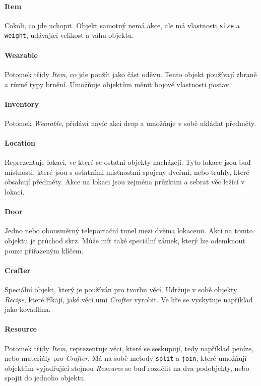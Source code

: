 \documentclass[11pt, a4paper]{article}
\def\class#1{\emph{#1}}
\begin{document}
\paragraph{Item} Cokoli, co jde uchopit. Objekt samotný nemá akce, ale má vlastnosti \texttt{size} a \texttt{weight}, udávající velikost a váhu objektu.

\paragraph{Wearable} Potomek třídy \class{Item}, co jde použít jako část oděvu. Tento objekt používají zbraně a různé typy brnění. Umožňuje objektům měnit bojové vlastnosti postav.

\paragraph{Inventory} Potomek \class{Wearable}, přidává navíc akci drop a umožňuje v sobě ukládat předměty.

\paragraph{Location} Reprezentuje lokaci, ve které se ostatní objekty nacházejí. Tyto lokace jsou buď místnosti, které jsou s ostatními místnostmi spojeny dveřmi, nebo truhly, které obsahují předměty. Akce na lokaci jsou zejména průzkum a sebrat věc ležící v lokaci.

\paragraph{Door} Jedno nebo obousměrný teleportační tunel mezi dvěma lokacemi. Akcí na tomto objektu je průchod skrz. Může mít také speciální zámek, který lze odemknout pouze přiřazeným klíčem.

\paragraph{Crafter} Speciální objekt, který je používán pro tvorbu věcí. Udržuje v sobě objekty \class{Recipe}, které říkají, jaké věci umí \class{Crafter} vyrobit. Ve hře se vyskytuje například jako kovadlina.

\paragraph{Resource} Potomek třídy \class{Item}, reprezentuje věci, které se seskupují, tedy například peníze, nebo materiály pro \class{Crafter}. Má na sobě metody \texttt{split} a \texttt{join}, které umožňují objektům vyjadřující stejnou \class{Resource} se buď rozdělit na dva podobjekty, nebo spojit do jednoho objektu.
\end{document}
